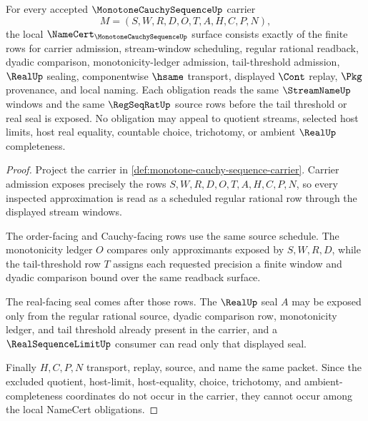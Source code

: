 \begin{theorem}
\label{thm:monotone-cauchy-sequence-namecert-obligations}
For every accepted $\MonotoneCauchySequenceUp$ carrier
$$
M=(S,W,R,D,O,T,A,H,C,P,N),
$$
the local $\NameCert_{\MonotoneCauchySequenceUp}$ surface consists exactly of the finite rows for carrier admission, stream-window scheduling, regular rational readback, dyadic comparison, monotonicity-ledger admission, tail-threshold admission, $\RealUp$ sealing, componentwise $\hsame$ transport, displayed $\Cont$ replay, $\Pkg$ provenance, and local naming. Each obligation reads the same $\StreamNameUp$ windows and the same $\RegSeqRatUp$ source rows before the tail threshold or real seal is exposed. No obligation may appeal to quotient streams, selected host limits, host real equality, countable choice, trichotomy, or ambient $\RealUp$ completeness.
\end{theorem}
\begin{proof}
Project the carrier in \autoref{def:monotone-cauchy-sequence-carrier}. Carrier admission exposes precisely the rows $S,W,R,D,O,T,A,H,C,P,N$, so every inspected approximation is read as a scheduled regular rational row through the displayed stream windows.

The order-facing and Cauchy-facing rows use the same source schedule. The monotonicity ledger $O$ compares only approximants exposed by $S,W,R,D$, while the tail-threshold row $T$ assigns each requested precision a finite window and dyadic comparison bound over the same readback surface.

The real-facing seal comes after those rows. The $\RealUp$ seal $A$ may be exposed only from the regular rational source, dyadic comparison row, monotonicity ledger, and tail threshold already present in the carrier, and a $\RealSequenceLimitUp$ consumer can read only that displayed seal.

Finally $H,C,P,N$ transport, replay, source, and name the same packet. Since the excluded quotient, host-limit, host-equality, choice, trichotomy, and ambient-completeness coordinates do not occur in the carrier, they cannot occur among the local NameCert obligations.
\end{proof}

